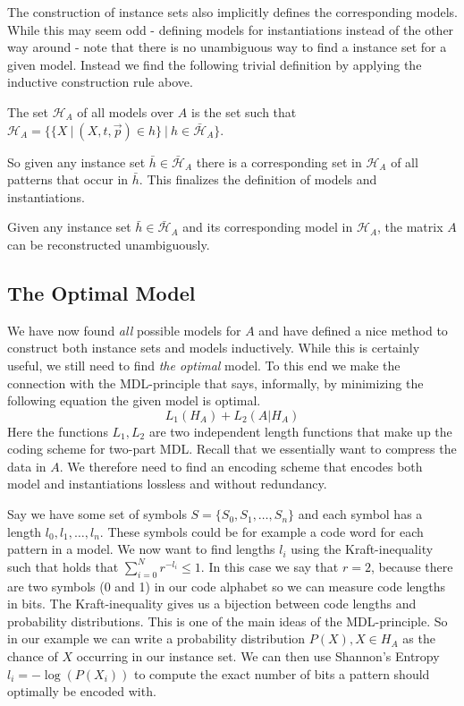 \documentclass{llncs}
\begin{document}
The construction of instance sets also implicitly defines the corresponding models. While this may seem odd - defining models for instantiations instead of the other way around - note that there is no unambiguous way to find a instance set for a given model. Instead we find the following trivial definition by applying the inductive construction rule above.
\begin{definition}
The set $\mathcal{H}_A$ of all models over $A$ is the set such that $\mathcal{H}_A=\Big\{\{X \ | \ (X,t,\vec{p})\in h\} \ \Big | \ h \in \bar{\mathcal{H}}_A \Big\}$. 
\end{definition}
So given any instance set $\bar{h}\in \bar{\mathcal{H}}_A$ there is a corresponding set in $\mathcal{H}_A$ of all patterns that occur in $\bar{h}$. This finalizes the definition of models and instantiations.
\begin{theorem}
Given any instance set $\bar{h}\in \bar{\mathcal{H}}_A$ and its corresponding model in $\mathcal{H}_A$, the matrix $A$ can be reconstructed unambiguously.
\end{theorem}

\subsection{The Optimal Model}

We have now found \emph{all} possible models for $A$ and have defined a nice method to construct both instance sets and models inductively. While this is certainly useful, we still need to find \emph{the optimal} model. To this end we make the connection with the MDL-principle that says, informally, by minimizing the following equation the given model is optimal.
$$
L_1(H_A) + L_2(A|H_A)
$$
Here the functions $L_1, L_2$ are two independent length functions that make up the coding scheme for two-part MDL. Recall that we essentially want to compress the data in $A$. We therefore need to find an encoding scheme that encodes both model and instantiations lossless and without redundancy.

Say we have some set of symbols $S=\{S_0,S_1,\dots,S_n\}$ and each symbol has a length $l_0,l_1,\dots,l_n$. These symbols could be for example a code word for each pattern in a model. We now want to find lengths $l_i$ using the Kraft-inequality such that holds that $\displaystyle\sum^N_{i=0}r^{-l_i} \leq 1$. In this case we say that $r=2$, because there are two symbols (0 and 1) in our code alphabet so we can measure code lengths in bits. 
The Kraft-inequality gives us a bijection between code lengths and probability distributions. This is one of the main ideas of the MDL-principle. So in our example we can write a probability distribution $P(X), X \in H_A$ as the chance of $X$ occurring in our instance set. We can then use Shannon's Entropy $l_i=-\log(P(X_i))$ to compute the exact number of bits a pattern should optimally be encoded with.
\end{document}
